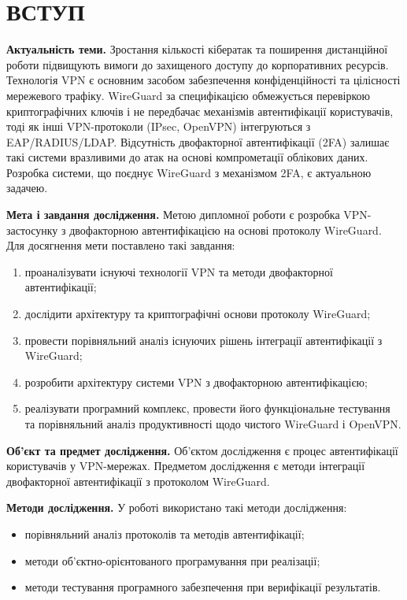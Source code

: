 \chapter*{ВСТУП}
\thispagestyle{fancy}

\textbf{Актуальність теми.}
Зростання кількості кібератак та поширення дистанційної роботи підвищують
вимоги до захищеного доступу до корпоративних ресурсів. Технологія
VPN є основним засобом забезпечення конфіденційності та цілісності мережевого трафіку.
WireGuard за специфікацією обмежується перевіркою криптографічних ключів і
не передбачає механізмів автентифікації користувачів, тоді як інші
VPN-протоколи (IPsec, OpenVPN) інтегруються з EAP/RADIUS/LDAP. Відсутність
двофакторної автентифікації (2FA) залишає такі системи вразливими до атак
на основі компрометації облікових даних. Розробка системи, що поєднує WireGuard з механізмом 2FA,
є актуальною задачею.

\textbf{Мета і завдання дослідження.}
Метою дипломної роботи є розробка VPN-застосунку з двофакторною автентифікацією
на основі протоколу WireGuard. Для досягнення мети поставлено такі завдання:
\begin{enumerate}
  \item проаналізувати існуючі технології VPN та методи двофакторної автентифікації;
  \item дослідити архітектуру та криптографічні основи протоколу WireGuard;
  \item провести порівняльний аналіз існуючих рішень інтеграції автентифікації з WireGuard;
  \item розробити архітектуру системи VPN з двофакторною автентифікацією;
  \item реалізувати програмний комплекс, провести його функціональне тестування
        та порівняльний аналіз продуктивності щодо чистого WireGuard і OpenVPN.
\end{enumerate}

\textbf{Об'єкт та предмет дослідження.}
Об'єктом дослідження є процес автентифікації користувачів у VPN-мережах.
Предметом дослідження є методи інтеграції двофакторної автентифікації
з протоколом WireGuard.

\textbf{Методи дослідження.}
У роботі використано такі методи дослідження:
\begin{itemize}
  \item порівняльний аналіз протоколів та методів автентифікації;
  \item методи об'єктно-орієнтованого програмування при реалізації;
  \item методи тестування програмного забезпечення при верифікації результатів.
\end{itemize}

